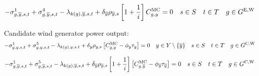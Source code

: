 \documentclass{article}
\begin{document}
\begin{equation}
-\dMinPowerOutput[\iGenerator,\iYearTerminal,\iScenario,\iInterval] + \dMaxPowerOutputWindExisting[\iGenerator,\iYearTerminal,\iScenario,\iInterval] - \dPowerBalance[k(\iGenerator),\iYearTerminal,\iScenario,\iInterval] + \cDiscountRate[\iYearTerminal] \cScenarioDuration[\iYearTerminal,\iScenario] \left[1 + \frac{1}{\cInterestRate}\right] \cMarginalCost = 0 \quad \iScenario \in \sScenarios \quad \iInterval \in \sIntervals \quad \iGenerator \in \sGeneratorsExistingWind
\end{equation}



Candidate wind generator power output:
\begin{equation}
-\dMinPowerOutput + \dMaxPowerOutputWindCandidate - \dPowerBalance[k(\iGenerator),\iYear,\iScenario,\iInterval] + \cDiscountRate \cScenarioDuration \left[\cMarginalCost - \vBaseline\vPermitPrice \right] = 0 \quad \iYear \in \sYears \setminus \{\iYearTerminal\} \quad \iScenario \in \sScenarios \quad \iInterval \in \sIntervals \quad \iGenerator \in \sGeneratorsCandidateWind
\end{equation}

\begin{equation}
-\dMinPowerOutput[\iGenerator,\iYearTerminal,\iScenario,\iInterval] + \dMaxPowerOutputWindCandidate[\iGenerator,\iYearTerminal,\iScenario,\iInterval] - \dPowerBalance[k(\iGenerator),\iYearTerminal,\iScenario,\iInterval] + \cDiscountRate[\iYearTerminal] \cScenarioDuration[\iYearTerminal,\iScenario] \left[1 + \frac{1}{\cInterestRate}\right] \left[\cMarginalCost[\iGenerator,\iYearTerminal] - \vBaseline[\iYearTerminal]\vPermitPrice[\iYearTerminal] \right] = 0 \quad \iScenario \in \sScenarios \quad \iInterval \in \sIntervals \quad \iGenerator \in \sGeneratorsCandidateWind
\end{equation}
\end{document}
